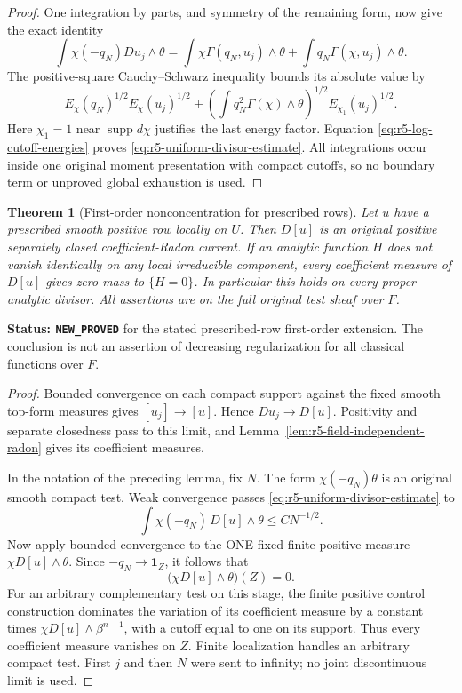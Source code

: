 \documentclass[11pt,a4paper]{article}
\numberwithin{equation}{section}
\newtheorem{theorem}{Theorem}[section]
\theoremstyle{definition}
\theoremstyle{remark}
\begin{document}
\begin{proof}
One integration by parts, and symmetry of the remaining form,
now give the exact identity
\[
 \int\chi(-q_N)Du_j\wedge\theta
   =\int\chi\Gamma(q_N,u_j)\wedge\theta
          +\int q_N\Gamma(\chi,u_j)\wedge\theta .
\]
The positive-square Cauchy--Schwarz inequality bounds its absolute
value by
\[
 E_\chi(q_N)^{1/2}E_\chi(u_j)^{1/2}
 +\left(\int q_N^2\Gamma(\chi)\wedge\theta\right)^{1/2}
                              E_{\chi_1}(u_j)^{1/2}.
\]
Here $\chi_1=1$ near $\operatorname{supp}d\chi$ justifies the
last energy factor.  Equation \eqref{eq:r5-log-cutoff-energies}
proves \eqref{eq:r5-uniform-divisor-estimate}.  All integrations
occur inside one original moment presentation with compact
cutoffs, so no boundary term or unproved global exhaustion is used.
\end{proof}

\begin{theorem}[First-order nonconcentration for prescribed rows]
\label{thm:r5-prescribed-row-analytic-nonmass}
Let $u$ have a prescribed smooth positive row locally on $U$.
Then $D[u]$ is an original positive separately closed
coefficient-Radon current.  If an analytic function $H$ does not
vanish identically on any local irreducible component, every
coefficient measure of $D[u]$ gives zero mass to $\{H=0\}$.
In particular this holds on every proper analytic divisor.
All assertions are on the full original test sheaf over $F$.
\end{theorem}

\noindent\textbf{Status: \texttt{NEW\_PROVED}} for the stated
prescribed-row first-order extension.  The conclusion is not an
assertion of decreasing regularization for all classical functions
over $F$.

\begin{proof}
Bounded convergence on each compact support against the fixed
smooth top-form measures gives $[u_j]\to[u]$.  Hence
$Du_j\to D[u]$.  Positivity and separate closedness pass to
this limit, and Lemma~\ref{lem:r5-field-independent-radon}
gives its coefficient measures.

In the notation of the preceding lemma, fix $N$.  The form
$\chi(-q_N)\theta$ is an original smooth compact test.  Weak
convergence passes \eqref{eq:r5-uniform-divisor-estimate} to
\[
 \int\chi(-q_N)\,D[u]\wedge\theta\leq C N^{-1/2}.
\]
Now apply bounded convergence to the ONE fixed finite positive
measure $\chi D[u]\wedge\theta$.  Since
$-q_N\to\mathbf1_Z$, it follows that
\[
 \bigl(\chi D[u]\wedge\theta\bigr)(Z)=0.
\]
For an arbitrary complementary test on this stage, the finite
positive control construction dominates the variation of its
coefficient measure by a constant times
$\chi D[u]\wedge\beta^{n-1}$, with a cutoff equal to one
on its support.  Thus every coefficient measure vanishes on $Z$.
Finite localization handles an arbitrary compact test.  First
$j$ and then $N$ were sent to infinity; no joint discontinuous
limit is used.
\end{proof}
\end{document}
